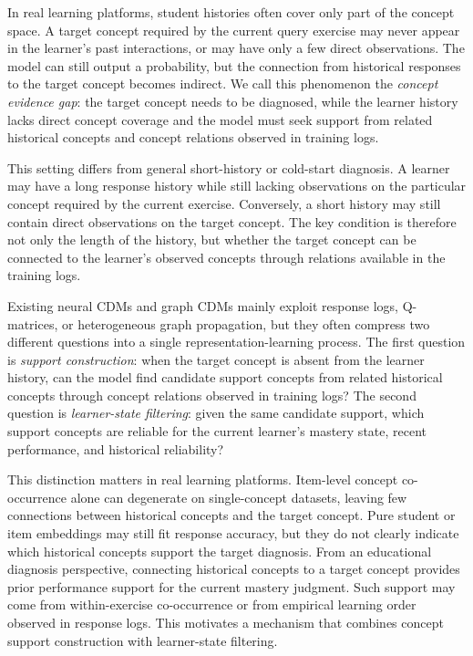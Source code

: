 \documentclass[conference]{IEEEtran}
\begin{document}
In real learning platforms, student histories often cover only part of the concept space. A target concept required by the current query exercise may never appear in the learner's past interactions, or may have only a few direct observations. The model can still output a probability, but the connection from historical responses to the target concept becomes indirect. We call this phenomenon the \emph{concept evidence gap}: the target concept needs to be diagnosed, while the learner history lacks direct concept coverage and the model must seek support from related historical concepts and concept relations observed in training logs.

This setting differs from general short-history or cold-start diagnosis. A learner may have a long response history while still lacking observations on the particular concept required by the current exercise. Conversely, a short history may still contain direct observations on the target concept. The key condition is therefore not only the length of the history, but whether the target concept can be connected to the learner's observed concepts through relations available in the training logs.

Existing neural CDMs and graph CDMs mainly exploit response logs, Q-matrices, or heterogeneous graph propagation, but they often compress two different questions into a single representation-learning process. The first question is \emph{support construction}: when the target concept is absent from the learner history, can the model find candidate support concepts from related historical concepts through concept relations observed in training logs? The second question is \emph{learner-state filtering}: given the same candidate support, which support concepts are reliable for the current learner's mastery state, recent performance, and historical reliability?

This distinction matters in real learning platforms. Item-level concept co-occurrence alone can degenerate on single-concept datasets, leaving few connections between historical concepts and the target concept. Pure student or item embeddings may still fit response accuracy, but they do not clearly indicate which historical concepts support the target diagnosis. From an educational diagnosis perspective, connecting historical concepts to a target concept provides prior performance support for the current mastery judgment. Such support may come from within-exercise co-occurrence or from empirical learning order observed in response logs. This motivates a mechanism that combines concept support construction with learner-state filtering.
\end{document}
